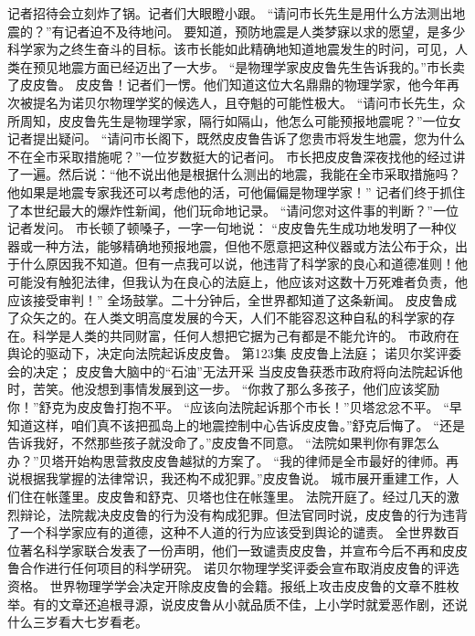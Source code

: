 \documentclass[a4paper,12pt,UTF8,twoside]{ctexbook}
\begin{document}
        记者招待会立刻炸了锅。记者们大眼瞪小跟。 
        “请问市长先生是用什么方法测出地震的？”有记者迫不及待地问。 
        要知道，预防地震是人类梦寐以求的愿望，是多少科学家为之终生奋斗的目标。该市长能如此精确地知道地震发生的时问，可见，人类在预见地震方面已经迈出了一大步。 
        “是物理学家皮皮鲁先生告诉我的。”市长卖了皮皮鲁。 
        皮皮鲁！记者们一愣。他们知道这位大名鼎鼎的物理学家，他今年再次被提名为诺贝尔物理学奖的候选人，且夺魁的可能性极大。 
        “请问市长先生，众所周知，皮皮鲁先生是物理学家，隔行如隔山，他怎么可能预报地震呢？”一位女记者提出疑问。 
        “请问市长阁下，既然皮皮鲁告诉了您贵市将发生地震，您为什么不在全市采取措施呢？”一位岁数挺大的记者问。 
        市长把皮皮鲁深夜找他的经过讲了一遍。然后说：“他不说出他是根据什么测出的地震，我能在全市采取措施吗？他如果是地震专家我还可以考虑他的活，可他偏偏是物理学家！” 
        记者们终于抓住了本世纪最大的爆炸性新闻，他们玩命地记录。 
        “请问您对这件事的判断？”一位记者发问。 
        市长顿了顿嗓子，一字一句地说：  “皮皮鲁先生成功地发明了一种仪器或一种方法，能够精确地预报地震，但他不愿意把这种仪器或方法公布于众，出于什么原因我不知道。但有一点我可以说，他违背了科学家的良心和道德准则！他可能没有触犯法律，但我认为在良心的法庭上，他应该对这数十万死难者负责，他应该接受审判！” 
        全场鼓掌。二十分钟后，全世界都知道了这条新闻。 
        皮皮鲁成了众矢之的。在人类文明高度发展的今天，人们不能容忍这种自私的科学家的存在。科学是人类的共同财富，任何人想把它据为己有都是不能允许的。 
        市政府在舆论的驱动下，决定向法院起诉皮皮鲁。   第123集 
        皮皮鲁上法庭； 
        诺贝尔奖评委会的决定； 
        皮皮鲁大脑中的“石油”无法开采   
        当皮皮鲁获悉市政府将向法院起诉他时，苦笑。他没想到事情发展到这一步。 
        “你救了那么多孩子，他们应该奖励你！”舒克为皮皮鲁打抱不平。 
        “应该向法院起诉那个市长！”贝塔忿忿不平。 
        “早知道这样，咱们真不该把孤岛上的地震控制中心告诉皮皮鲁。”舒克后悔了。 
        “还是告诉我好，不然那些孩子就没命了。”皮皮鲁不同意。 
        “法院如果判你有罪怎么办？”贝塔开始构思营救皮皮鲁越狱的方案了。 
        “我的律师是全市最好的律师。再说根据我掌握的法律常识，我还构不成犯罪。”皮皮鲁说。 
        城市展开重建工作，人们住在帐蓬里。皮皮鲁和舒克、贝塔也住在帐篷里。 
        法院开庭了。经过几天的激烈辩论，法院裁决皮皮鲁的行为没有构成犯罪。但法官同时说，皮皮鲁的行为违背了一个科学家应有的道德，这种不人道的行为应该受到舆论的谴责。 
        全世界数百位著名科学家联合发表了一份声明，他们一致谴责皮皮鲁，并宣布今后不再和皮皮鲁合作进行任何项目的科学研究。 
        诺贝尔物理学奖评委会宣布取消皮皮鲁的评选资格。 
        世界物理学学会决定开除皮皮鲁的会籍。报纸上攻击皮皮鲁的文章不胜枚举。有的文章还追根寻源，说皮皮鲁从小就品质不佳，上小学时就爱恶作剧，还说什么三岁看大七岁看老。 
\end{document}
